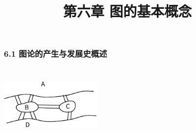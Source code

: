 \documentclass{beamer}
\begin{document}
\begin{CJK}{UTF8}{gbsn}
\newtheorem{Ex}{习题}
\newtheorem{definition1.1.1}{定义1.1.1}
\newtheorem{definition6.2.1}{定义6.2.1}
\newtheorem{definition6.2.2}{定义6.2.2}
\newtheorem{definition6.2.3}{定义6.2.3}
\newtheorem{definition6.2.4}{定义6.2.4}
\newtheorem{definition6.2.5}{定义6.2.5}
\newtheorem{definition6.2.6}{定义6.2.6}
\newtheorem{definition6.2.7}{定义6.2.7}
\newtheorem{definition6.2.8}{定义6.2.8}
\newtheorem{definition6.2.9}{定义6.2.9}
\newtheorem{definition6.2.10}{定义6.2.10}

\newtheorem{definition6.3.1}{定义6.3.1}
\newtheorem{definition6.3.2}{定义6.3.2}
\newtheorem{definition6.3.3}{定义6.3.3}
\newtheorem{definition6.3.4}{定义6.3.4}
\newtheorem{definition6.3.5}{定义6.3.5}
\newtheorem{theorem6.3.1}{定理6.3.1}





\newtheorem{definition6.4.1}{定义6.4.1}
\newtheorem{definition6.4.2}{定义6.4.2}
\newtheorem{definition6.4.3}{定义6.4.3}
\newtheorem{definition6.4.4}{定义6.4.4}
\newtheorem{definition6.4.5}{定义6.4.5}
\newtheorem{definition6.4.6}{定义6.4.6}
\newtheorem{definition6.4.7}{定义6.4.7}

\newtheorem{definition1}{Problem Statement}
\newtheorem{theorem6.4.1}{定理6.4.1}
\newtheorem{theorem6.4.2}{定理6.4.2}
\newtheorem{theorem6.4.3}{定理6.4.3}
\newtheorem{Thm1}{Theorem1}
\newtheorem{Thm2}{Theorem2}
\newtheorem{Thm3}{Theorem3}
\newtheorem{Thm4}{Theorem4}

\newtheorem{definition6.5.1}{定义6.5.1}
\newtheorem{definition6.5.2}{定义6.5.2}

\newtheorem{theorem6.5.1}{定理6.5.1}
\newtheorem{theorem6.5.2}{定理6.5.2}
\newtheorem{theorem6.5.3}{定理6.5.3}

\newtheorem{definition6.6.1}{定义6.6.1}
\newtheorem{theorem6.6.1}{定理6.6.1}
\newtheorem{theorem6.6.2}{定理6.6.2}
\newtheorem{theorem6.6.3}{定理6.6.3}
\newtheorem{theorem6.6.4}{引理6.6.1}



\newtheorem{theorem6.2.1}{定理6.2.1}
\newtheorem{theorem6.2.2}{推论6.2.1}
\newtheorem{example1}{例:}

\date{}
\author{}

\title{第六章 图的基本概念}
\begin{frame}
  \titlepage
\end{frame}  
\begin{frame}
  \frametitle{6.1 图论的产生与发展史概述}
  \centering
\includegraphics[width=5cm,height=4cm]{konigsberg} 
\end{frame}



\end{CJK}
\end{document}
